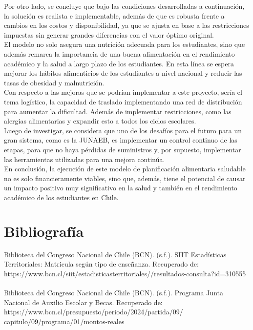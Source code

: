 \documentclass[letterpaper]{article}
\begin{document}
Por otro lado, se concluye que bajo las condiciones desarrolladas a continuación, la solución es realista e implementable, además de que es robusta frente a cambios en los costos y disponibilidad, ya que se ajusta en base a las restricciones impuestas sin generar grandes diferencias con el valor óptimo original.\\
 
El modelo no solo asegura una nutrición adecuada para los estudiantes, sino que además remarca la importancia de una buena alimentación en el rendimiento académico y la salud a largo plazo de los estudiantes. En esta línea se espera mejorar los hábitos alimenticios de los estudiantes a nivel nacional y reducir las tasas de obesidad y malnutrición.\\ 

Con respecto a las mejoras que se podrían implementar a este proyecto, sería el tema logístico, la capacidad de traslado implementando una red de distribución para aumentar la dificultad. Además de implementar restricciones, como las alergias alimentarias y expandir esto a todos los ciclos escolares. \\

Luego de investigar, se considera que uno de los desafíos para el futuro para un gran sistema, como es la JUNAEB, es implementar un control continuo de las etapas, para que no haya pérdidas de suministros y, por supuesto, implementar las herramientas utilizadas para una mejora continúa. \\

En conclusión, la ejecución de este modelo de planificación alimentaria saludable no es solo financieramente viables, sino que, además, tiene el potencial de causar un impacto positivo muy significativo en la salud y también en el rendimiento académico de los estudiantes en Chile.

\newpage
\section{Bibliografía}

Biblioteca del Congreso Nacional de Chile (BCN). (s.f.). SIIT Estadísticas Territoriales: Matricula según tipo de enseñanza. Recuperado de: https://www.bcn.cl/siit/estadisticasterritoriales//resultados-consulta?id=310555 
\\
\\

Biblioteca del Congreso Nacional de Chile (BCN). (s.f.). Programa Junta Nacional de Auxilio Escolar y Becas. Recuperado de: https://www.bcn.cl/presupuesto/periodo/2024/partida/09/\\capitulo/09/programa/01/montos-reales
\\
\\
\end{document}
